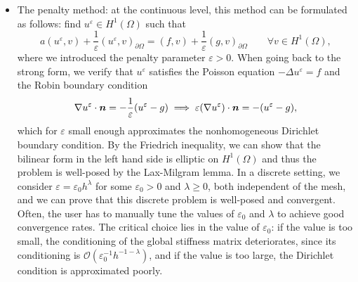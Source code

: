 \documentclass{article}
\renewcommand{\vec}{\vectorsym}
\begin{document}
\begin{itemize}
    \item The penalty method: at the continuous level, this method can be formulated as follows: find $u^\varepsilon\in H^1(\Omega)$ such that 
$$a(u^\varepsilon, v) + \frac{1}{\varepsilon} (u^\varepsilon, v)_{\partial\Omega} = (f,v) + \frac{1}{\varepsilon} (g,v)_{\partial\Omega} \qquad \forall v\in H^1(\Omega),$$
where we introduced the penalty parameter $\varepsilon>0$. When going back to the strong form, we verify that $u^\varepsilon$ satisfies the Poisson equation $-\Delta u^\varepsilon = f$ and the Robin boundary condition 
$$\nabla u^\varepsilon \cdot\vec n = -\frac{1}{\varepsilon}(u^\varepsilon - g) \implies \varepsilon (\nabla u^\varepsilon) \cdot \vec n = -(u^\varepsilon - g),$$
which for $\varepsilon$ small enough approximates the nonhomogeneous Dirichlet boundary condition. By the Friedrich inequality, we can show that the bilinear form in the left hand side is elliptic on $H^1(\Omega)$ and thus the problem is well-posed by the Lax-Milgram lemma. In a discrete setting, we consider $\varepsilon = \varepsilon_0 h^\lambda$ for some $\varepsilon_0 > 0$ and $\lambda\geq 0$, both independent of the mesh, and we can prove that this discrete problem is well-posed and convergent. Often, the user has to manually tune the values of $\varepsilon_0$ and $\lambda$ to achieve good convergence rates. The critical choice lies in the value of $\varepsilon_0$: if the value is too small, the conditioning of the global stiffness matrix deteriorates, since its conditioning is $\mathcal{O}(\varepsilon_0^{-1}h^{-1-\lambda})$, and if the value is too large, the Dirichlet condition is approximated poorly. 


\end{itemize}
\end{document}
